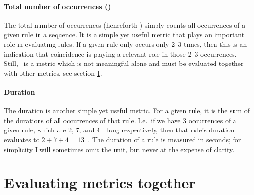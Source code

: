 \paragraph{Total number of occurrences (\noc)}
The total number of occurrences (henceforth \noc) simply counts all occurrences of a given rule in a sequence.
It is a simple yet useful metric that plays an important role in evaluating rules.
If a given rule only occurs only 2--3 times, then this is an indication that coincidence is playing a relevant role in those 2--3 occurrences.
Still, \noc\ is a metric which is not meaningful alone and must be evaluated together with other metrics, see section \ref{sec:fpmeval}.

\paragraph{Duration}
The duration is another simple yet useful metric.
For a given rule, it is the sum of the durations of all occurrences of that rule.
I.e.~if we have 3 occurrences of a given rule, which are 2, 7, and 4~\s\ long respectively, then that rule's duration evaluates to \(2+7+4=13\)~\s.
The duration of a rule is measured in seconds; for simplicity I will sometimes omit the unit, but never at the expense of clarity.

\section{Evaluating metrics together}
\label{sec:fpmeval}